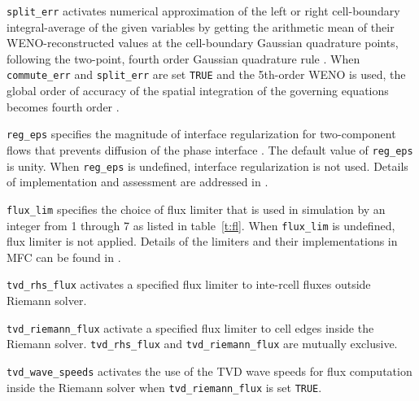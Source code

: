 \documentclass[11pt]{article}
\begin{document}
\texttt{split\_err} activates numerical approximation of the left or right cell-boundary integral-average of the given variables by getting the arithmetic mean of their WENO-reconstructed values at the cell-boundary Gaussian quadrature points, following the two-point, fourth order Gaussian quadrature rule \citep{Titarev04}. When \texttt{commute\_err} and \texttt{split\_err} are set \texttt{TRUE} and the 5th-order WENO is used, the global order of accuracy of the spatial integration of the governing equations becomes fourth order \citep{Coralic14}.

\texttt{reg\_eps} specifies the magnitude of interface regularization for two-component flows that prevents diffusion of the phase interface \citep{Tiwari13}. The default value of \texttt{reg\_eps} is unity. When \texttt{reg\_eps} is undefined, interface regularization is not used. Details of implementation and assessment are addressed in \citet{Meng16,Schmidmayer19}.

\texttt{flux\_lim} specifies the choice of flux limiter that is used in simulation by an integer from 1 through 7 as listed in table~\ref{t:fl}. When \texttt{flux\_lim} is undefined, flux limiter is not applied. Details of the limiters and their implementations in MFC can be found in \citet{Meng16}.

\texttt{tvd_rhs_flux} activates a specified flux limiter to inte-rcell fluxes outside Riemann solver.

\texttt{tvd_riemann_flux} activate a specified flux limiter to cell edges inside the Riemann solver. \texttt{tvd_rhs_flux} and \texttt{tvd_riemann_flux} are mutually exclusive.

\texttt{tvd_wave_speeds} activates the use of the TVD wave speeds for flux computation inside the Riemann solver when \texttt{tvd_riemann_flux} is set \texttt{TRUE}.
\end{document}
